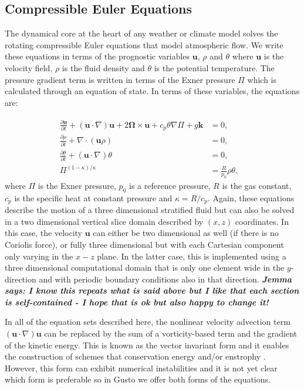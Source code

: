 \documentclass[journal abbreviation, manuscript]{copernicus}
\def\MM#1{\boldsymbol{#1}}
\newcommand{\pp}[2]{\frac{\partial #1}{\partial #2}}
\newcommand{\JScomment}[1]{\textit{\textbf{Jemma says: #1}}}
\begin{document}
\subsection{Compressible Euler Equations}
The dynamical core at the heart of any weather or climate model solves
the rotating compressible Euler equations that model atmospheric
flow. We write these equations in terms of the prognostic variables
$\MM{u}$, $\rho$ and $\theta$ where $\MM{u}$ is the velocity field,
$\rho$ is the fluid density and $\theta$ is the potential
temperature. The pressure gradient term is written in terms of the
Exner pressure $\Pi$ which is calculated through an equation of
state. In terms of these variables, the equations are:

\begin{align}
  \pp{\MM{u}}{t} + 
  (\MM{u}\cdot\nabla)\MM{u} +
  2\MM{\Omega}\times \MM{u} + c_p\theta\nabla \Pi + g\hat{\MM{k}} & = 0, \\
  \pp{\rho}{t} + \nabla\cdot(\MM{u}\rho) & = 0, \\
  \pp{\theta}{t} + (\MM{u}\cdot\nabla)\theta & = 0, \\
  \Pi^{(1-\kappa)/\kappa} & = \frac{R}{p_0}\rho\theta, & 
\end{align}
where $\Pi$ is the Exner pressure, $p_0$ is a reference pressure, $R$
is the gas constant, $c_p$ is the specific heat at constant pressure
and $\kappa=R/c_p$. Again, these equations describe the motion of a
three dimensional stratified fluid but can also be solved in a
two dimensional vertical slice domain described by $(x, z)$
coordinates. In this case, the velocity $\MM{u}$ can either be two
dimensional as well (if there is no Coriolis force), or fully three
dimensional but with each Cartesian component only varying in the
$x-z$ plane. In the latter case, this is implemented using a three
dimensional computational domain that is only one element wide in the
$y$-direction and with periodic boundary conditions also in that
direction. \JScomment{I know this repeats what is said above but I
  like that each section is self-contained - I hope that is ok but
  also happy to change it!}

In all of the equation sets described here, the nonlinear velocity
advection term $(\MM{u}\cdot\nabla)\MM{u}$ can be replaced by the sum
of a vorticity-based term and the gradient of the kinetic energy. This
is known as the vector invariant form and it enables the construction
of schemes that conservation energy and/or enstrophy
\citep{mcrae2014energy, bauer2018energy, wimmer2020energy,
  wimmer2021energy}. However, this form can exhibit numerical
instabilities \citep{bell2017numerical} and it is not yet clear which
form is preferable so in Gusto we offer both forms of the equations.
\end{document}

